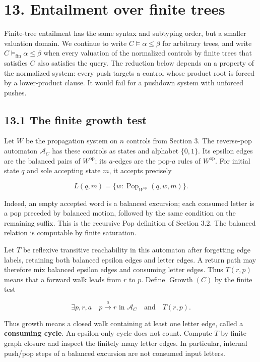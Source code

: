 \documentclass[
  11pt,
  a4paper,
]{article}
\begin{document}

\section{13. Entailment over finite
trees}\label{entailment-over-finite-trees}

Finite-tree entailment has the same syntax and subtyping order, but a
smaller valuation domain. We continue to write
\(C\models\alpha\le\beta\) for arbitrary trees, and write
\(C\models_{\mathrm{fin}}\alpha\le\beta\) when every valuation of the
normalized controls by finite trees that satisfies \(C\) also satisfies
the query. The reduction below depends on a property of the normalized
system: every push targets a control whose product root is forced by a
lower-product clause. It would fail for a pushdown system with unforced
pushes.

\subsection{13.1 The finite growth test}\label{the-finite-growth-test}

Let \(W\) be the propagation system on \(n\) controls from Section 3.
The reverse-pop automaton \(\mathcal A_C\) has these controls as states
and alphabet \(\{0,1\}\). Its epsilon edges are the balanced pairs of
\(W^{\mathrm{op}}\); its \(a\)-edges are the pop-\(a\) rules of
\(W^{\mathrm{op}}\). For initial state \(q\) and sole accepting state
\(m\), it accepts precisely

\[L(q,m)=\{w:\operatorname{Pop}_{W^{\mathrm{op}}}(q,w,m)\}.\]

Indeed, an empty accepted word is a balanced excursion; each consumed
letter is a pop preceded by balanced motion, followed by the same
condition on the remaining suffix. This is the recursive Pop definition
of Section 3.2. The balanced relation is computable by finite
saturation.

Let \(T\) be reflexive transitive reachability in this automaton after
forgetting edge labels, retaining both balanced epsilon edges and letter
edges. A return path may therefore mix balanced epsilon edges and
consuming letter edges. Thus \(T(r,p)\) means that a forward walk leads
from \(r\) to \(p\). Define \(\operatorname{Growth}(C)\) by the finite
test

\[\exists p,r,a\quad
p\mathrel{\xrightarrow{a}}r\text{ in }\mathcal A_C
\quad\text{and}\quad T(r,p).\tag{13.1}\]

Thus growth means a closed walk containing at least one letter edge,
called a \textbf{consuming cycle}. An epsilon-only cycle does not count.
Compute \(T\) by finite graph closure and inspect the finitely many
letter edges. In particular, internal push/pop steps of a balanced
excursion are not consumed input letters.
\end{document}
